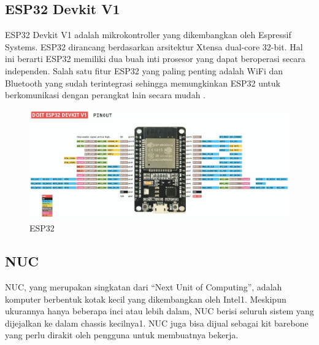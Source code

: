 \subsection{ESP32 Devkit V1}
ESP32 Devkit V1 adalah mikrokontroller yang dikembangkan oleh Espressif Systems. ESP32 dirancang berdasarkan arsitektur Xtensa dual-core 32-bit. Hal ini berarti ESP32 memiliki dua buah inti prosesor yang dapat beroperasi secara independen. Salah satu fitur ESP32 yang paling penting adalah WiFi dan Bluetooth yang sudah terintegrasi sehingga memungkinkan ESP32 untuk berkomunikasi dengan perangkat lain secara mudah \parencite{esp32}.
\begin{figure} [H] \centering
    \includegraphics[scale=0.3]{gambar/esp32 pinout.jpg}
    \caption{ESP32}
    \label{fig:Proses Flattening}
\end{figure}

\subsection{NUC}
NUC, yang merupakan singkatan dari “Next Unit of Computing”, adalah komputer berbentuk kotak kecil yang dikembangkan oleh Intel1. Meskipun ukurannya hanya beberapa inci atau lebih dalam, NUC berisi seluruh sistem yang dijejalkan ke dalam chassis kecilnya1. NUC juga bisa dijual sebagai kit barebone yang perlu dirakit oleh pengguna untuk membuatnya bekerja\parencite{nuc}.

